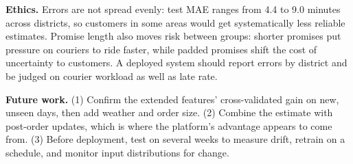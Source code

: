 \textbf{Ethics.} Errors are not spread evenly: test MAE ranges from 4.4 to 9.0 minutes across districts,
so customers in some areas would get systematically less reliable estimates. Promise length also moves
risk between groups: shorter promises put pressure on couriers to ride faster, while padded promises
shift the cost of uncertainty to customers. A deployed system should report errors by district and be
judged on courier workload as well as late rate.

\textbf{Future work.} (1) Confirm the extended features' cross-validated gain on new, unseen days, then
add weather and order size. (2) Combine the estimate with post-order updates, which is
where the platform's advantage appears to come from. (3) Before deployment, test on several weeks to
measure drift, retrain on a schedule, and monitor input distributions for change.

